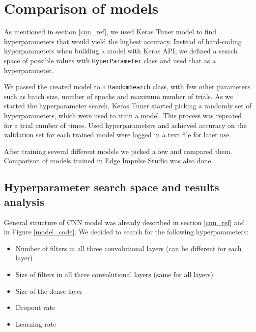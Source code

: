 \section{ Comparison of models}\label{model_comparisons}

As mentioned in section \ref{cnn_ref}, we used Keras Tuner model to find hyperparameters that would yield the highest accuracy.
Instead of hard-coding hyperparameters when building a model with Keras API, we defined a search space of possible values with \verb|HyperParameter| class and used that as a hyperparameter.

We passed the created model to a \verb|RandomSearch| class, with few other parameters such as batch size, number of epochs and maximum number of trials.
As we started the hyperparameter search, Keras Tuner started picking a randomly set of hyperparameters, which were used to train a model.
This process was repeated for a trial number of times.
Used hyperparameters and achieved accuracy on the validation set for each trained model were logged in a text file for later use.

After training several different models we picked a few and compared them.
Comparison of models trained in Edge Impulse Studio was also done.


\subsection{ Hyperparameter search space and results analysis}

General structure of CNN model was already described in section \ref{cnn_ref} and in Figure \ref{model_code}.
We decided to search for the following hyperparameters: 

\begin{itemize}
    \item Number of filters in all three convolutional layers (can be different for each layer)
    \item Size of filters in all three convolutional layers (same for all layers)
    \item Size of the dense layer
    \item Dropout rate 
    \item Learning rate
\end{itemize}

